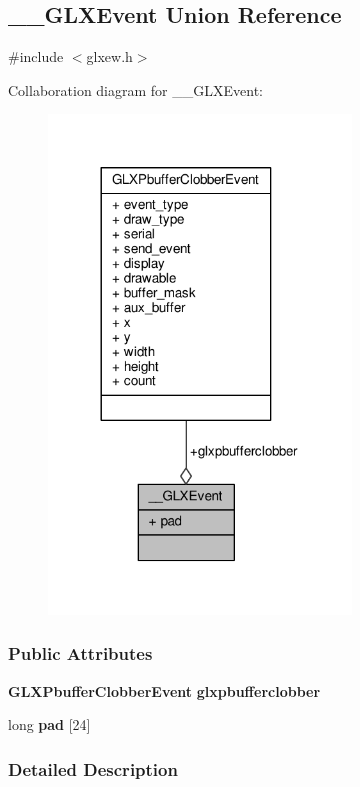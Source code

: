 \subsection{\+\_\+\+\_\+\+G\+L\+X\+Event Union Reference}
\label{union____GLXEvent}


{\ttfamily \#include $<$glxew.\+h$>$}



Collaboration diagram for \+\_\+\+\_\+\+G\+L\+X\+Event\+:
\nopagebreak
\begin{figure}[H]
\begin{center}
\leavevmode
\includegraphics[width=228pt]{dd/d28/union____GLXEvent__coll__graph}
\end{center}
\end{figure}
\subsubsection*{Public Attributes}
\begin{DoxyCompactItemize}
\item 
{\bf G\+L\+X\+Pbuffer\+Clobber\+Event} {\bf glxpbufferclobber}
\item 
long {\bf pad} [24]
\end{DoxyCompactItemize}


\subsubsection{Detailed Description}


